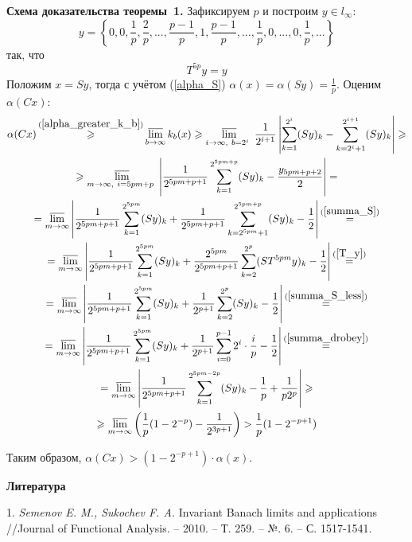 \documentclass[a5paper,12pt,openbib]{report}
\begin{document}
\textbf{Схема доказательства теоремы~1.}
Зафиксируем $p$ и построим $y\in l_\infty$:
\begin{equation*}\label{y_construction}
	y = \left\{
		0, 0, \frac{1}{p}, \frac{2}{p}, %
		...,
		\frac{p-1}{p}, 1, \frac{p-1}{p},
		...,
		\frac{1}{p},
		0, ..., 0,
		\frac{1}{p}, ...
	\right\}
\end{equation*}
так, что
\begin{equation}\label{T_y}
	T^{5p}y = y
\end{equation}
Положим $x = Sy$, тогда с учётом (\ref{alpha_S})
$
	\alpha (x) = \alpha (Sy) = \frac{1}{p}
$.
Оценим $\alpha(Cx)$:
\begin{multline*}
	\alpha (Cx) \mathop{\geqslant}^{(\ref{alpha_greater_k_b})}
	\varlimsup_{b\to \infty} k_b(x) \geqslant
	\varlimsup_{
		i\to \infty,~
		b=2^i~
	}\frac{1}{2^{i+1}}\left|
		\sum_{k=1}^{2^i}(Sy)_k - \sum_{k=2^i+1}^{2^{i+1}}(Sy)_k
	\right| \geqslant
	\\ \geqslant
	\varlimsup_{
		m\to \infty,~
		i=5pm+p~
	}\left|
		\frac{1}{2^{5pm+p+1}}\sum_{k=1}^{2^{5pm+p}}(Sy)_k - \frac{y_{5pm+p+2}}{2}
	\right| =
	\\=
	\varlimsup_{m\to \infty}\left|
		\frac{1}{2^{5pm+p+1}}\sum_{k=1}^{2^{5pm}}(Sy)_k
		+
		\frac{1}{2^{5pm+p+1}}\sum_{k=2^{5pm}+1}^{2^{5pm+p}}(Sy)_k
		- \frac{1}{2}
	\right|
	\mathop{=}^{(\ref{summa_S})}
	\\=
	\varlimsup_{m\to \infty}\left|
		\frac{1}{2^{5pm+p+1}}\sum_{k=1}^{2^{5pm}}(Sy)_k
		+
		\frac{2^{5pm}}{2^{5pm+p+1}} \sum_{k=2}^{2^p}(ST^{5pm}y)_k
		- \frac{1}{2}
	\right|
	\mathop{=}^{(\ref{T_y})}
	\\=
	\varlimsup_{m\to \infty}\left|
		\frac{1}{2^{5pm+p+1}}\sum_{k=1}^{2^{5pm}}(Sy)_k
		+
		\frac{1}{2^{p+1}} \sum_{k=2}^{2^p}(Sy)_k
		- \frac{1}{2}
	\right|
	\mathop{=}^{(\ref{summa_S_less})}
	\\=
	\varlimsup_{m\to \infty}\left|
		\frac{1}{2^{5pm+p+1}}\sum_{k=1}^{2^{5pm}}(Sy)_k
		+
		\frac{1}{2^{p+1}} \sum_{i=0}^{p-1}2^i \cdot \frac{i}{p}
		- \frac{1}{2}
	\right|
	\mathop{=}^{(\ref{summa_drobey})}
	\\=
	\varlimsup_{m\to \infty}\left|
		\frac{1}{2^{5pm+p+1}}\sum_{k=1}^{2^{5pm-2p}}(Sy)_k
		-\frac{1}{p} + \frac{1}{p 2^p}
	\right| \geqslant
	\\ \geqslant
	\varlimsup_{m\to \infty} \left(
		\frac{1}{p} (1-2^{-p})
		- \frac{1}{2^{3p+1}}
	\right) >
	\frac{1}{p} (1-2^{-p+1})
\end{multline*}


Таким образом,
$
	\alpha(Cx) >
	(1-2^{-p+1}) \cdot \alpha(x)
$.

\smallskip \centerline{\bf Литература}\nopagebreak

1. {\it Semenov E. M., Sukochev F. A.}
 Invariant Banach limits and applications //Journal of Functional Analysis. – 2010. – Т. 259. – №. 6. – С. 1517-1541.
\end{document}
